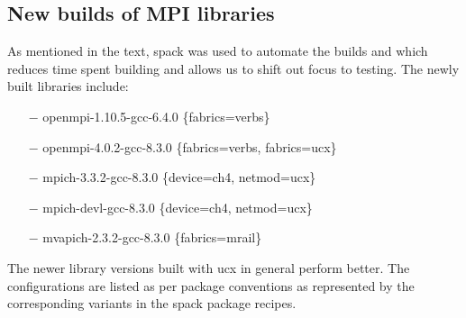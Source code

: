 \documentclass[sigconf,authordraft]{acmart}
\begin{document}
\subsection{New builds of MPI libraries}
As mentioned in the text, spack\cite{spack} was used to automate the builds and which reduces time spent building and allows us to shift out focus to testing. The newly built libraries include:
\begin{itemize}
	\item[$-$] openmpi-1.10.5-gcc-6.4.0 \{fabrics=verbs\}
	\item[$-$] openmpi-4.0.2-gcc-8.3.0 \{fabrics=verbs, fabrics=ucx\}
	\item[$-$] mpich-3.3.2-gcc-8.3.0 \{device=ch4, netmod=ucx\}
	\item[$-$] mpich-devl-gcc-8.3.0 \{device=ch4, netmod=ucx\}
	\item[$-$] mvapich-2.3.2-gcc-8.3.0 \{fabrics=mrail\}
\end{itemize} 
The newer library versions built with ucx in general perform better. The configurations are listed as per package conventions as represented by the corresponding variants in the spack package recipes.
\end{document}
